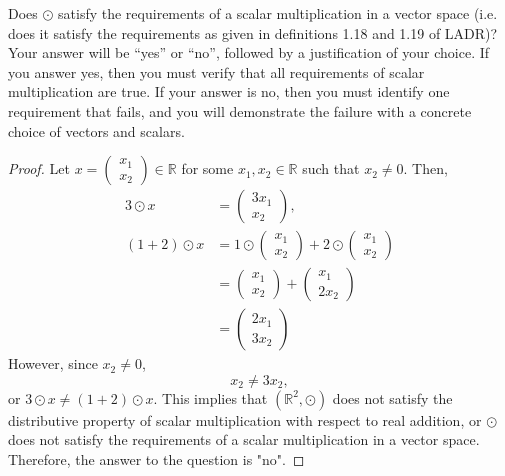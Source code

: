 	Does $\odot$ satisfy the requirements of a scalar multiplication in a vector space (i.e. does it satisfy the requirements as given in definitions 1.18 and 1.19 of LADR)?  Your answer will be ``yes'' or ``no'', followed by a justification of your choice.  If you answer yes, then you must verify that all requirements of scalar multiplication are true.  If your answer is no, then you must identify one requirement that fails, and you will demonstrate the failure with a concrete choice of vectors and scalars.
\renewcommand\qedsymbol{}
\renewcommand*{\proofname}{Solution}
\begin{proof}
    Let $x=\begin{pmatrix}x_1\\x_2\end{pmatrix}\in\mathbb{R}$ for some $x_1, x_2\in\mathbb{R}$ such that $x_2\not=0$. Then,
    \[
        \begin{aligned}
            3\odot x     &=\begin{pmatrix}3x_1\\x_2\end{pmatrix},\\
            (1+2)\odot x &=1\odot\begin{pmatrix}x_1\\x_2\end{pmatrix} + 2\odot\begin{pmatrix}x_1\\x_2\end{pmatrix}\\
                         &=\begin{pmatrix}x_1\\x_2\end{pmatrix} + \begin{pmatrix}x_1\\2x_2\end{pmatrix}\\
                         &=\begin{pmatrix}2x_1\\3x_2\end{pmatrix}
        \end{aligned}
    \]
    However, since $x_2\not=0$,
    \[
        x_2\not=3x_2,
    \]
    or $3\odot x\not=(1+2)\odot x$. This implies that $(\mathbb{R}^2,\odot)$ does not satisfy the distributive property of scalar multiplication with respect to real addition, or $\odot$ does not satisfy the requirements of a scalar multiplication in a vector space. Therefore, the answer to the question is "no".
\end{proof}